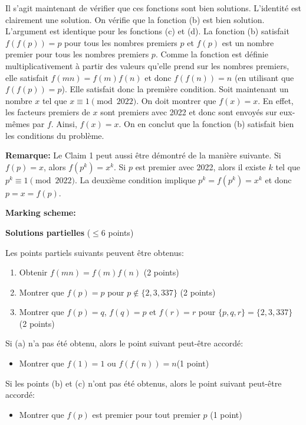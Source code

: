 {Il s'agit maintenant de vérifier que ces fonctions sont bien solutions. L'identité est clairement une solution. On vérifie que la fonction (b) est bien solution. L'argument est identique pour les fonctions (c) et (d). La fonction (b) satisfait $f(f(p))=p$ pour tous les nombres premiers $p$ et $f(p)$ est un nombre premier pour tous les nombres premiers $p$. Comme la fonction est définie multiplicativement à partir des valeurs qu'elle prend sur les nombres premiers, elle satisfait $f(mn)=f(m)f(n)$ et donc $f(f(n))=n$ (en utilisant que $f(f(p))=p$). Elle satisfait donc la première condition. Soit maintenant un nombre $x$ tel que $x\equiv 1\pmod {2022}$. On doit montrer que $f(x)=x$. En effet, les facteurs premiers de $x$ sont premiers avec 2022 et donc sont envoyés sur eux-mêmes par $f$. Ainsi, $f(x)=x$. On en conclut que la fonction (b) satisfait bien les conditions du problème.

\textbf{Remarque:} Le Claim 1 peut aussi être démontré de la manière suivante. Si $f(p)=x$, alors $f(p^k)=x^k$. Si $p$ est premier avec 2022, alors il existe $k$ tel que $p^k\equiv 1\pmod {2022}$. La deuxième condition implique $p^k=f(p^k)=x^k$ et donc $p=x=f(p)$.

\textbf{Marking scheme:}

\textbf{Solutions partielles} \dotfill ($\leq 6$ points)

Les points partiels suivants peuvent être obtenus:
\begin{enumerate}
\item Obtenir $f(mn)=f(m)f(n)$ \dotfill (2 points)
\item Montrer que $f(p)=p$ pour $p\notin \{2,3,337\}$ \dotfill (2 points)
\item Montrer que $f(p)=q$, $f(q)=p$ et $f(r)=r$ pour $\{p,q,r\}=\{2,3,337\}$ \dotfill (2 points) 
\end{enumerate}

Si (a) n'a pas été obtenu, alors le point suivant peut-être accordé:
\begin{itemize}
\item Montrer que $f(1)=1$ ou $f(f(n))=n$\dotfill (1 point)
\end{itemize}

Si les points (b) et (c) n'ont pas été obtenus, alors le point suivant peut-être accordé:
\begin{itemize}
\item Montrer que $f(p)$ est premier pour tout premier $p$ \dotfill (1 point)
\end{itemize}

}
